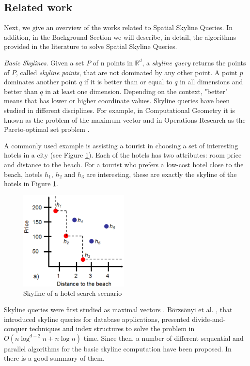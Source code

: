 \documentclass[11pt,onecolumn]{elsart3p}
\begin{document}
\subsection{Related work}
Next, we give an overview of the works related to Spatial Skyline Queries. In addition, in the Background Section we will describe, in detail, the algorithms provided in the literature to solve Spatial Skyline Queries.

\vspace{1em}
{\it Basic Skylines}.
Given a set $P$ of n points in  $\mathbb{R}^d$, a {\it skyline query} returns the points of $P$, called {\it skyline points}, that are not dominated by any other point. A point $p$ dominates another point $q$ if it is better than or equal to $q$ in all dimensions and better than $q$ in at least one dimension.
Depending on the context, "better" means that has lower or higher coordinate values.
Skyline queries have been studied in different disciplines. For example, in Computational Geometry it is known as the problem of the maximum vector \cite{GSG07} and in Operations Research as the Pareto-optimal set problem \cite{KLP75}.

A commonly used example is assisting a tourist in choosing a set of interesting hotels in a city (see Figure \ref{fig:TraditSkyline}). Each of the hotels has two attributes: room price and distance to the beach. For a tourist who prefers a low-cost hotel close to the beach, hotels $h_1$, $h_2$ and $h_3$ are interesting, these are exactly the skyline of the hotels in Figure \ref{fig:TraditSkyline}.

\begin{figure}[!htp]
\begin{center}
\includegraphics[width=5.5cm]{img/TraditSkyline.eps}
\caption{Skyline of a hotel search scenario}
\label{fig:TraditSkyline}
\end{center}
\end{figure}

Skyline queries were first studied as maximal vectors \cite{KLP75}. B\"orzs\"onyi et al. \cite{BKS01}, that introduced skyline queries for database applications, presented divide-and-conquer techniques and index structures to solve the problem in $O(n \log^{d-2} n + n \log n)$ time. Since then, a number of different sequential  \cite{KRR02, PTFS05,GSG07} and parallel \cite{CLY12, PMS13, MPLZ14} algorithms for the basic skyline computation have been proposed. In \cite{WZSK17} there is a good summary of them.
\end{document}
